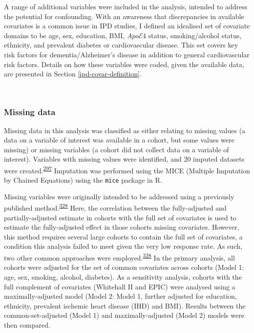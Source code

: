 \documentclass[a4paper, twoside]{templates/ociamthesis}
\begin{document}
A range of additional variables were included in the analysis, intended to address the potential for confounding. With an awareness that discrepancies in available covariates is a common issue in IPD studies, I defined an idealised set of covariate domains to be age, sex, education, BMI, \emph{Apo}\(\mathcal{E}4\) status, smoking/alcohol status, ethnicity, and prevalent diabetes or cardiovascular disease. This set covers key risk factors for dementia/Alzheimer's disease in addition to general cardiovascular risk factors. Details on how these variables were coded, given the available data, are presented in Section \ref{ipd-covar-definition}.

~

\hypertarget{missing-data-2}{%
\subsubsection{Missing data}\label{missing-data-2}}

Missing data in this analysis was classified as either relating to missing values (a data on a variable of interest was available in a cohort, but some values were missing) or missing variables (a cohort did not collect data on a variable of interest). Variables with missing values were identified, and 20 imputed datasets were created.\textsuperscript{\protect\hyperlink{ref-sterne2009}{297}} Imputation was performed using the MICE (Multiple Imputation by Chained Equations) using the \texttt{mice} package in R.

Missing variables were originally intended to be addressed using a previously published method.\textsuperscript{\protect\hyperlink{ref-fibrinogenstudiescollaboration2009}{328}} Here, the correlation between the fully-adjusted and partially-adjusted estimate in cohorts with the full set of covariates is used to estimate the fully-adjusted effect in those cohorts missing covariates. However, this method requires several large cohorts to contain the full set of covariates, a condition this analysis failed to meet given the very low response rate. As such, two other common approaches were employed.\textsuperscript{\protect\hyperlink{ref-fibrinogenstudiescollaboration2009}{328}} In the primary analysis, all cohorts were adjusted for the set of common covariates across cohorts (Model 1: age, sex, smoking, alcohol, diabetes). As a sensitivity analysis, cohorts with the full complement of covariates (Whitehall II and EPIC) were analysed using a maximally-adjusted model (Model 2: Model 1, further adjusted for education, ethnicity, prevalent ischemic heart disease (IHD) and BMI). Results between the common-set-adjusted (Model 1) and maximally-adjusted (Model 2) models were then compared.
\end{document}
